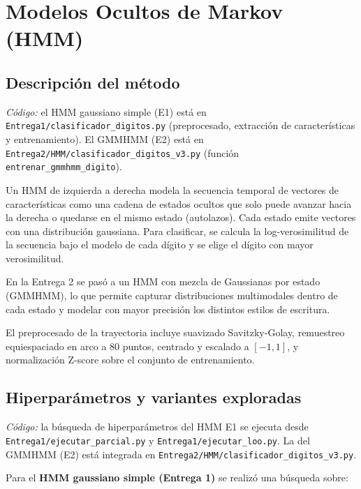 \documentclass[11pt,a4paper]{article}
\begin{document}
\newpage
\section{Modelos Ocultos de Markov (HMM)}

\subsection{Descripci\'{o}n del m\'{e}todo}

\textit{C\'{o}digo:} el HMM gaussiano simple (E1) est\'{a} en
\texttt{Entrega1/clasificador\_digitos.py} (preprocesado, extracci\'{o}n de
caracter\'{i}sticas y entrenamiento). El GMMHMM (E2) est\'{a} en
\texttt{Entrega2/HMM/clasificador\_digitos\_v3.py} (funci\'{o}n
\texttt{entrenar\_gmmhmm\_digito}).

Un HMM de izquierda a derecha modela la secuencia temporal de vectores de
caracter\'{i}sticas como una cadena de estados ocultos que solo puede avanzar hacia
la derecha o quedarse en el mismo estado (autolazos). Cada estado emite
vectores con una distribuci\'{o}n gaussiana. Para clasificar, se calcula la
log-verosimilitud de la secuencia bajo el modelo de cada d\'{i}gito y se elige
el d\'{i}gito con mayor verosimilitud.

En la Entrega 2 se pas\'{o} a un HMM con mezcla de Gaussianas por estado (GMMHMM),
lo que permite capturar distribuciones multimodales dentro de cada estado y
modelar con mayor precisi\'{o}n los distintos estilos de escritura.

El preprocesado de la trayectoria incluye suavizado Savitzky-Golay, remuestreo
equiespaciado en arco a 80 puntos, centrado y escalado a $[-1, 1]$, y
normalizaci\'{o}n Z-score sobre el conjunto de entrenamiento.

\subsection{Hiperpar\'{a}metros y variantes exploradas}

\textit{C\'{o}digo:} la b\'{u}squeda de hiperpar\'{a}metros del HMM E1 se
ejecuta desde \texttt{Entrega1/ejecutar\_parcial.py} y
\texttt{Entrega1/ejecutar\_loo.py}. La del GMMHMM (E2) est\'{a} integrada en
\texttt{Entrega2/HMM/clasificador\_digitos\_v3.py}.

Para el \textbf{HMM gaussiano simple (Entrega 1)} se realiz\'{o} una b\'{u}squeda sobre:
\end{document}
